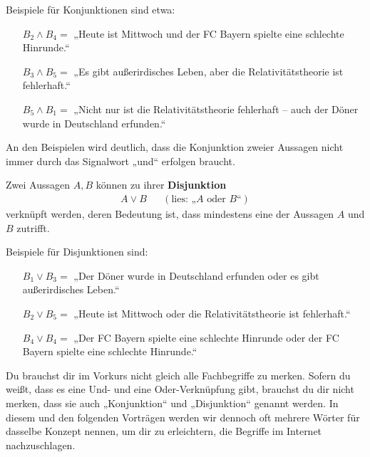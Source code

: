 \begin{bsp}
    Beispiele für Konjunktionen sind etwa:
    \begin{itemize}[labelindent=1.5em, leftmargin=!, labelwidth=]
        \item[$B_2\land B_4 =$] „Heute ist Mittwoch und der FC Bayern spielte eine schlechte Hinrunde.“
        \item[$B_3\land B_5 =$] „Es gibt außerirdisches Leben, aber die Relativitätstheorie ist fehlerhaft.“
        \item[$B_5\land B_1 =$] „Nicht nur ist die Relativitätstheorie fehlerhaft -- auch der Döner wurde in Deutschland erfunden.“
    \end{itemize}
    An den Beispielen wird deutlich, dass die Konjunktion zweier Aussagen nicht immer durch das Signalwort „und“ erfolgen braucht. 
\end{bsp}
	
	
\begin{de} 
    Zwei Aussagen $A,B$ können zu ihrer \textbf{Disjunktion}
    \begin{align*}
        A\lor B && (\text{lies: „$A$ oder $B$“})
    \end{align*}
    verknüpft werden, deren Bedeutung ist, dass mindestens eine der Aussagen $A$ und $B$ zutrifft.
\end{de}
    

\begin{bsp}
    Beispiele für Disjunktionen sind:
    \begin{itemize}[labelindent=1.5em, leftmargin=!, labelwidth=]
        \item[$B_1 \lor B_3 =$] „Der Döner wurde in Deutschland erfunden oder es gibt außerirdisches Leben.“
        \item[$B_2\lor B_5 =$] „Heute ist Mittwoch oder die Relativitätstheorie ist fehlerhaft.“
        \item[$B_4\lor B_4=$] „Der FC Bayern spielte eine schlechte Hinrunde oder der FC Bayern spielte eine schlechte Hinrunde.“
    \end{itemize}
\end{bsp}

		
\begin{bem}[Fachbegriffe]
    Du brauchst dir im Vorkurs nicht gleich alle Fachbegriffe zu merken. Sofern du weißt, dass es eine Und- und eine Oder-Verknüpfung gibt, brauchst du dir nicht merken, dass sie auch „Konjunktion“ und „Disjunktion“ genannt werden. In diesem und den folgenden Vorträgen werden wir dennoch oft mehrere Wörter für dasselbe Konzept nennen, um dir zu erleichtern, die Begriffe im Internet nachzuschlagen.
\end{bem}

